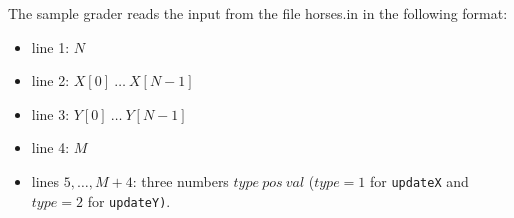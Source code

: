 The sample grader reads the input from the file horses.in in the following format: 
\begin{itemize}
\item line 1: $N$
\item line 2: $X[0]\ \ldots\ X[N - 1]$
\item line 3: $Y[0]\ \ldots\ Y[N - 1]$
\item line 4: $M$
\item lines $5, \ldots, M + 4$: three numbers $type\ pos\ val$ ($type=1$ for \texttt{updateX} and $type=2$ for \texttt{updateY)}.
\end{itemize}
